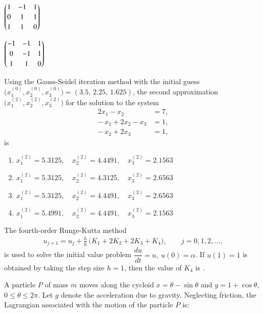 \documentclass[journal,12pt,onecolumn]{IEEEtran}
\theoremstyle{remark}
\begin{document}
\begin{enumerate}
{\begin{enumerate}
\begin{multicols}{2}
\item $\begin{pmatrix}1&-1&1\\[2pt]0&1&1\\[2pt]1&1&0\end{pmatrix}$

\item $\begin{pmatrix}-1&-1&1\\[2pt]0&-1&1\\[2pt]1&1&0\end{pmatrix}$

\end{multicols}
\end{enumerate}

\item Using the Gauss-Seidel iteration method with the initial guess
$\bigl(x_1^{(0)},x_2^{(0)},x_3^{(0)}\bigr)=(3.5,\,2.25,\,1.625)$,
the second approximation $\bigl(x_1^{(2)},x_2^{(2)},x_3^{(2)}\bigr)$ for the solution to the system
\begin{align*}
2x_1 - x_2 &= 7,\\
-\,x_1 + 2x_2 - x_3 &= 1,\\
-\,x_2 + 2x_3 &= 1,
\end{align*}
is

\hfill{}

\begin{enumerate}
\item $x_1^{(2)}=5.3125,\quad x_2^{(2)}=4.4491,\quad x_3^{(2)}=2.1563$
\item $x_1^{(2)}=5.3125,\quad x_2^{(2)}=4.3125,\quad x_3^{(2)}=2.6563$
\item $x_1^{(2)}=5.3125,\quad x_2^{(2)}=4.4491,\quad x_3^{(2)}=2.6563$
\item $x_1^{(2)}=5.4991,\quad x_2^{(2)}=4.4491,\quad x_3^{(2)}=2.1563$
\end{enumerate}

\item The fourth-order Runge-Kutta method
\begin{align*}
u_{j+1}
= u_j+\frac{h}{6}\,\bigl(K_1+2K_2+2K_3+K_4\bigr),\qquad j=0,1,2,\ldots,
\end{align*}
is used to solve the initial value problem \(\dfrac{du}{dt}=u,\ u(0)=\alpha\).
If \(u(1)=1\) is obtained by taking the step size \(h=1\), then the value of
\(K_4\) is \underline{\hspace{3cm}}.

\hfill{}

\item A particle \(P\) of mass \(m\) moves along the cycloid
\(x=\theta-\sin\theta\) and \(y=1+\cos\theta\), \(0\le\theta\le2\pi\).
Let \(g\) denote the acceleration due to gravity. Neglecting friction, the
Lagrangian associated with the motion of the particle \(P\) is:

}
\end{enumerate}
\end{document}
